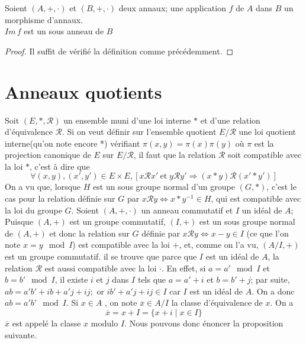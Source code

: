 \begin{proposition}
Soient $(A,+,\cdot)$ et $(B,+,\cdot)$ deux annaux; une application $f$ de $A$ dans $B$ un morphisme d'annaux.\\
$Im\,f$ est un sous anneau de $B$
\end{proposition}
\begin{proof}
    Il suffit de vérifié la définition comme précédemment.
\end{proof}

\section{Anneaux quotients}
Soit $(E,*,\mathcal{R})$ un ensemble muni d'une loi interne $*$ et d'une relation d'équivalence $\mathcal{R}$. Si on veut définir sur l'ensemble quotient $E/\mathcal{R}$ une loi quotient interne(qu'on note encore *) vérifiant $\pi(x,y)=\pi(x)\pi(y)$ où $\pi$ est la projection canonique de $E$ sur $E/\mathcal{R}$, il faut que la relation $\mathcal{R}$ soit compatible avec la loi $*$, c'est à dire que 
\[
\forall(x,y),(x',y')\in E\times E, [x\mathcal{R}x'\:\text{et} \; y\mathcal{R}y' \Rightarrow (x*y)\mathcal{R}(x'*y')]
\]
On a vu que, lorsque $H$ est un sous groupe normal d'un groupe $(G,*)$, c'est le cas pour la relation définie sur $G$ par $x\mathcal{R}y \Leftrightarrow x*y^{-1}\in H$, qui est compatible avec la loi du groupe $G$. Soient $(A,+,\cdot)$ un anneau commutatif et $I$ un idéal de $A$; Puisque $(A,+)$ est un groupe commutatif, $(I,+)$ est un sous groupe normal de $(A,+)$ et donc la relation sur $G$ définie par $x\mathcal{R}y\Leftrightarrow x-y\in I$ (ce que l'on note $x=y \mod I$) est compatible avec la loi $+$, et, comme on l'a vu, $(A/I,+)$ est un groupe commutatif. il se trouve que parce que $I$ est un idéal de $A$, la relation $\mathcal{R}$ est aussi compatible avec la loi $\cdot$. En effet, si $a=a'\mod I$ et $b=b' \mod I$, il existe $i$ et $j$ dans $I$ tels que $a=a'+i$ et $b=b'+j$; par suite, $ab=a'b' +ib+a'j+ij; $ or $ib'+a'j+ij\in I$ car $I$ est un idéal de $A$. On a donc $ab=a'b' \mod I$. Si $x \in A$ , on note $\overline{x}\in A/I$ la classe d'équivalence de $x$. On a
\[
\overline{x}=x+I=\{x+i\mid x\in I\}
\]
$\overline{x}$ est appelé la classe $x$ modulo $I$. Nous pouvons donc énoncer la proposition suivante.

